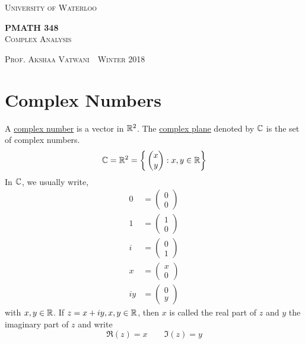 \documentclass[11pt]{article}
\newcommand{\thiscoursecode}{PMATH 348}
\newcommand{\thiscoursename}{Complex Analysis}
\newcommand{\thisprof}{Prof. Akshaa Vatwani}
\newcommand{\thisterm}{Winter 2018}
\begin{document}
\begin{titlepage}
\begin{centering}
{\scshape\LARGE University of Waterloo \par}
\globe
{\huge\bf \thiscoursecode}\\
{\scshape\Large \thiscoursename}\\
\vspace{.3cm}
{\scshape \thisprof~\textbullet~\thisterm \par}
\end{centering}
\sectionline
\tableofcontents
\sectionline
\thispagestyle{empty}
\end{titlepage}

\section{Complex Numbers}
\begin{definition}
A \underline{complex number} is a vector in $\mathbb{R}^2$. The \underline{complex plane} denoted by $\mathbb{C}$ is the
set of complex numbers. 
\begin{equation*}
\mathbb{C} = \mathbb{R}^2 = \bigg\{\begin{pmatrix}x\\y\end{pmatrix}: x, y \in \mathbb{R} \bigg\}
\end{equation*}
In $\mathbb{C}$, we usually write,
\begin{align*} 
0 &= \begin{pmatrix}0\\0\end{pmatrix}\\
1 &= \begin{pmatrix}1\\0\end{pmatrix}\\
i &= \begin{pmatrix}0\\1\end{pmatrix}\\
x &= \begin{pmatrix}x\\0\end{pmatrix}\\
iy &= \begin{pmatrix}0\\y\end{pmatrix}
\end{align*}
with $x, y \in \mathbb{R}$. If $z = x + iy, x, y \in \mathbb{R}$, then $x$ is called the real
part of $z$ and $y$ the imaginary part of $z$ and write
\begin{equation*}
\Re(z) = x \qquad \Im(z) = y
\end{equation*}
\end{definition}
\end{document}
